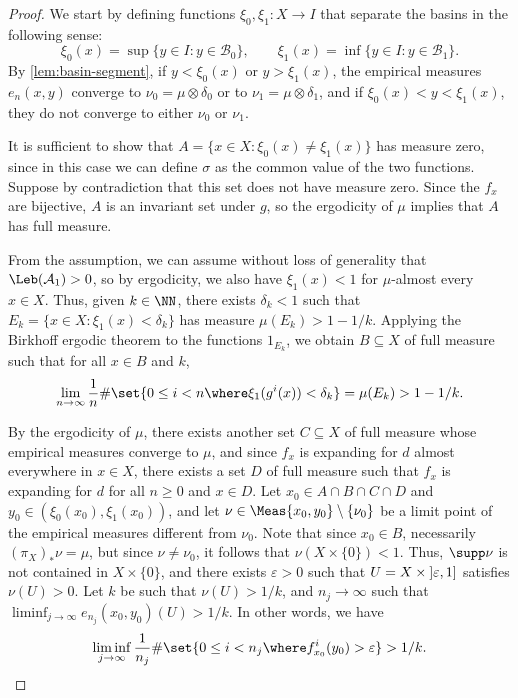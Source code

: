 \documentclass[../main.tex]{subfiles}
\begin{document}
\begin{proof}
  We start by defining functions \(\xi_0, \xi_1 \colon X \to I\) that separate the basins in the following sense:
  \begin{equation*}
    \xi_0(x) = \sup \{ y \in I : y \in \mathcal{B}_0 \}, \qquad \xi_1(x) = \inf \{ y \in I : y \in \mathcal{B}_1 \}.
  \end{equation*}
  By \cref{lem:basin-segment}, if \(y < \xi_0(x)\) or \(y > \xi_1(x)\), the empirical measures \(e_n(x,y)\) converge to \(\nu_0 = \mu \otimes \delta_0\) or to \(\nu_1 = \mu \otimes \delta_1\), and if \(\xi_0(x) < y < \xi_1(x)\), they do not converge to either \(\nu_0\) or \(\nu_1\).
  
  It is sufficient to show that \(A = \{ x \in X : \xi_0(x) \neq \xi_1(x) \}\) has measure zero, since in this case we can define \(\sigma\) as the common value of the two functions. Suppose by contradiction that this set does not have measure zero. Since the \(f_x\) are bijective, \(A\) is an invariant set under \(g\), so the ergodicity of \(\mu\) implies that \(A\) has full measure.

  From the assumption, we can assume without loss of generality that \(\Leb(\mathcal{A}_1) > 0\), so by ergodicity, we also have \(\xi_1(x) < 1\) for \(\mu\)-almost every \(x \in X\). Thus, given \(k \in \NN\), there exists \(\delta_k < 1\) such that \(E_k = \{ x \in X : \xi_1(x) < \delta_k \}\) has measure \(\mu(E_k) > 1 - 1/k\). Applying the Birkhoff ergodic theorem to the functions \(1_{E_k}\), we obtain \(B \subseteq X\) of full measure such that for all \(x \in B\) and \(k\),
  \begin{equation}\label{eq:time-small}
    \lim_{n \to \infty} \frac{1}{n} \# \set{ 0 \leq i < n \where \xi_1(g^i(x)) < \delta_k} = \mu(E_{k}) > 1 - 1/k.
  \end{equation}
  
  By the ergodicity of \(\mu\), there exists another set \(C \subseteq X\) of full measure whose empirical measures converge to \(\mu\), and since \(f_x\) is expanding for \(d\) almost everywhere in \(x \in X\), there exists a set \(D\) of full measure such that \(f_x\) is expanding for \(d\) for all \(n \geq 0\) and \(x \in D\). Let \(x_0 \in A \cap B \cap C \cap D\) and \(y_0 \in (\xi_0(x_0), \xi_1(x_0))\), and let \(\nu \in \Meas{x_0,y_0} \setminus \{ \nu_0 \}\) be a limit point of the empirical measures different from \(\nu_0\). Note that since \(x_0 \in B\), necessarily \((\pi_X)_* \nu = \mu\), but since \(\nu \neq \nu_0\), it follows that \(\nu(X \times \{ 0 \}) < 1\). Thus, \(\supp \nu\) is not contained in \(X \times \{ 0 \}\), and there exists \(\varepsilon > 0\) such that \(U = X \times \interval[open left]{\varepsilon}{1}\) satisfies \(\nu(U) > 0\). Let \(k\) be such that \(\nu(U) > 1/k\), and \(n_j \to \infty\) such that \(\liminf_{j \to \infty} e_{n_j}(x_0,y_0)(U) > 1/k\).
  In other words, we have
  \begin{equation}\label{eq:time-big}
    \liminf_{j \to \infty} \frac{1}{n_j} \# \set{ 0 \leq i < n_j \where f_{x_0}^i(y_0) > \varepsilon} > 1/k.
  \end{equation}


\end{proof}
\end{document}

